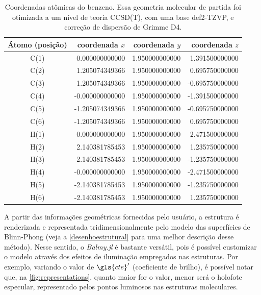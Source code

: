 \begin{table}[htb]
	\centering
	\caption{\label{tab:coords} Coordenadas atômicas do benzeno. Essa geometria molecular de partida foi otimizada a um nível de teoria CCSD(T), com uma base def2-TZVP, e correção de dispersão de Grimme D4.}	
	\begin{tabular}{crrr}
		\toprule
		\textbf{Átomo (posição)} & coordenada $x$ & coordenada $y$ & coordenada $z$
		\\ 
		\midrule
C(1)  &    0.000000000000  &   1.950000000000  &   1.391500000000  \\
C(2)  &    1.205074349366  &   1.950000000000  &   0.695750000000  \\
C(3)  &    1.205074349366  &   1.950000000000  &  -0.695750000000  \\
C(4)  &   -0.000000000000  &   1.950000000000  &  -1.391500000000  \\
C(5)  &   -1.205074349366  &   1.950000000000  &  -0.695750000000  \\
C(6)  &   -1.205074349366  &   1.950000000000  &   0.695750000000  \\
H(1)  &    0.000000000000  &   1.950000000000  &   2.471500000000  \\
H(2)  &    2.140381785453  &   1.950000000000  &   1.235750000000  \\
H(3)  &    2.140381785453  &   1.950000000000  &  -1.235750000000  \\
H(4)  &   -0.000000000000  &   1.950000000000  &  -2.471500000000  \\
H(5)  &   -2.140381785453  &   1.950000000000  &  -1.235750000000  \\
H(6)  &   -2.140381785453  &   1.950000000000  &   1.235750000000  \\
    \bottomrule
	\end{tabular}
\end{table}

A partir das informações geométricas fornecidas pelo usuário, a estrutura é renderizada e representada tridimensionalmente pelo modelo das superfícies de Blinn-Phong (veja a \autoref{desenhoestrutural} para uma melhor descrição desse método). Nesse sentido, o \textit{Balmy.jl} é bastante versátil, pois é possível customizar o modelo através dos efeitos de iluminação empregados nas estruturas. Por exemplo, variando o valor de $\gls{cte}'$ (coeficiente de brilho), é possível notar que, na \autoref{fig:representations}, quanto maior for o valor, menor será o holofote especular, representado pelos pontos luminosos nas estruturas moleculares.

